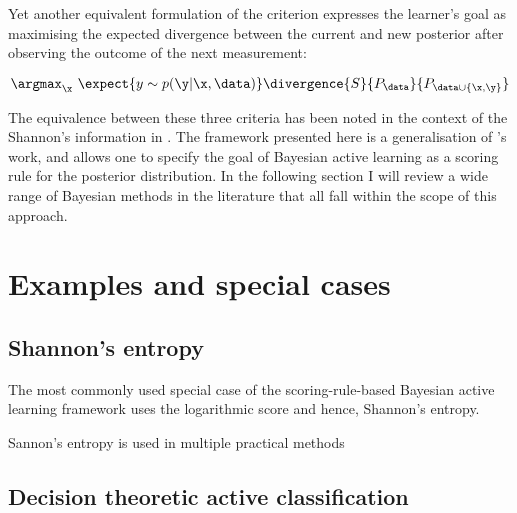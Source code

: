 Yet another equivalent formulation of the criterion expresses the learner's goal as maximising the expected divergence between the current and new posterior after observing the outcome of the next measurement:

\begin{equation}
	\argmax_\x\  \expect{y \sim p(\y\vert \x, \data)}\divergence{S}{P_{\data}}{P_{\data\cup\{\x,\y\}}}
\end{equation}

The equivalence between these three criteria has been noted in the context of the Shannon's information in \citep{MacKay1992}. The framework presented here is a generalisation of \citeauthor{MacKay1992}'s work, and allows one to specify the goal of Bayesian active learning as a scoring rule for the posterior distribution. In the following section I will review a wide range of Bayesian methods in the literature that all fall within the scope of this approach.


\section{Examples and special cases}
\subsection{Shannon's entropy}

The most commonly used special case of the scoring-rule-based Bayesian active learning framework uses the logarithmic score and hence, Shannon's entropy. 

Sannon's entropy is used in multiple practical methods \citep{MacKay1992,Lawrence2004,Krause2006,Ji2008,Settles2010,Houlsby2011,Huszar2012quantum}

\subsection{Decision theoretic active classification}

